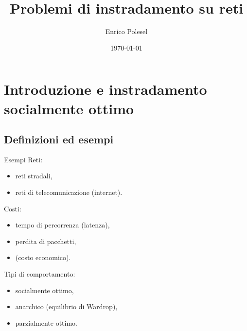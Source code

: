 \documentclass{beamer}
\title{Problemi di instradamento su reti}
\date{\today}
\author{Enrico Polesel}
\theoremstyle{plain}
\theoremstyle{definition}
\theoremstyle{remark}
\begin{document}
\maketitle



\section{Introduzione e instradamento socialmente ottimo}

\subsection{Definizioni ed esempi}

\begin{frame}{Esempi}
  Reti:
  \begin{itemize}
  \item reti stradali,
  \item reti di telecomunicazione (internet).
  \end{itemize}

  Costi:
  \begin{itemize}
  \item tempo di percorrenza (latenza),
  \item perdita di pacchetti,
  \item (costo economico).
  \end{itemize}

  Tipi di comportamento:
  \begin{itemize}
  \item socialmente ottimo,
  \item anarchico (equilibrio di Wardrop),
  \item parzialmente ottimo.
  \end{itemize}
\end{frame}
\end{document}
